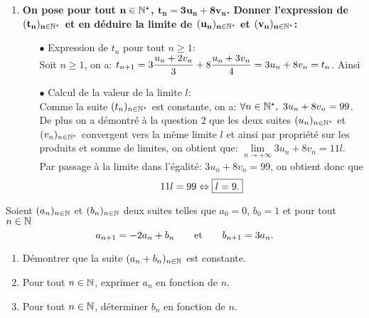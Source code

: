 \documentclass[a4paper, 11pt]{article}
\begin{document}
\begin{correction}
\begin{enumerate}
\begin{itemize}
\end{itemize}
Ainsi, on a donc montr\'e que les deux suites $(u_n)_{n\in\N^{\star}}$ et $(v_n)_{n\in\N^{\star}}$ sont adjacentes. D'apr\`{e}s le th\'eor\`{e}me sur les suites adjacentes, 
\item \textbf{On pose pour tout $\mathbf{n\in\mathbb{N}^{\star}}$, $\mathbf{t_n=3u_n+8v_n}$.
Donner l'expression de $\mathbf{(t_n)_{n\in\mathbb{N}^{\star}}}$ et en d\'eduire la limite de $\mathbf{(u_n)_{n\in\mathbb{N}^{\star}}}$ et $\mathbf{(v_n)_{n\in\mathbb{N}^{\star}}}$:}
\begin{itemize}
\item[$\bullet$] Expression de $t_n$ pour tout $n\geq 1$:\\
\noindent Soit $n\geq 1$, on a: $t_{n+1}=3\displaystyle\frac{u_n+2v_n}{3}+8\displaystyle\frac{u_n+3v_n}{4}=3u_n+8v_n=t_n$. Ainsi 

\item[$\bullet$] Calcul de la valeur de la limite $l$:\\
\noindent Comme la suite $(t_n)_{n\in\mathbb{N}^{\star}}$ est constante, on a: 
$\forall n\in\N^{\star},\ 3u_n+8v_n=99$. De plus on a d\'emontr\'e \`{a} la question 2 que les deux suites $(u_n)_{n\in\N^{\star}}$ et $(v_n)_{n\in\N^{\star}}$ convergent vers la m\^{e}me limite $l$ et ainsi par propri\'et\'e sur les produits et somme de limites, on obtient que: $\lim\limits_{n\to +\infty} 3u_n+8v_n=11l$. Par passage \`{a} la limite dans l'\'egalit\'e: $3u_n+8v_n=99$, on obtient donc que
$$11l=99 \Leftrightarrow \fbox{$l=9.$}$$
\end{itemize}
\end{enumerate}
\end{correction}









\begin{exercice} \;
Soient $(a_n)_{n\in\mathbb{N}}$ et $(b_n)_{n\in\mathbb{N}}$ deux suites telles que $a_0=0$, $b_0=1$ et pour tout $n\in\mathbb{N}$
$$a_{n+1}=-2a_n+b_n\qquad \hbox{et}\qquad b_{n+1}=3a_n.$$
\begin{enumerate}
\item D\'emontrer que la suite $(a_n+b_n)_{n\in\mathbb{N}}$ est constante.
\item Pour tout $n\in\mathbb{N}$, exprimer $a_n$ en fonction de $n$.
\item Pour tout $n\in\mathbb{N}$, d\'eterminer $b_n$ en fonction de $n$.
\end{enumerate}
\end{exercice}
\end{document}
